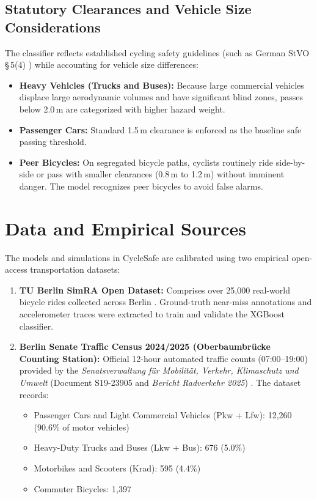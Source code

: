 \subsection{Statutory Clearances and Vehicle Size Considerations}
The classifier reflects established cycling safety guidelines (such as German StVO \S\,5(4) \cite{stvo2020germany}) while accounting for vehicle size differences:
\begin{itemize}
    \item \textbf{Heavy Vehicles (Trucks and Buses):} Because large commercial vehicles displace large aerodynamic volumes and have significant blind zones, passes below 2.0\,m are categorized with higher hazard weight.
    \item \textbf{Passenger Cars:} Standard 1.5\,m clearance is enforced as the baseline safe passing threshold.
    \item \textbf{Peer Bicycles:} On segregated bicycle paths, cyclists routinely ride side-by-side or pass with smaller clearances (0.8\,m to 1.2\,m) without imminent danger. The model recognizes peer bicycles to avoid false alarms.
\end{itemize}

\section{Data and Empirical Sources}
The models and simulations in CycleSafe are calibrated using two empirical open-access transportation datasets:
\begin{enumerate}
    \item \textbf{TU Berlin SimRA Open Dataset:} Comprises over 25,000 real-world bicycle rides collected across Berlin \cite{simra2020crowdsourcing}. Ground-truth near-miss annotations and accelerometer traces were extracted to train and validate the XGBoost classifier.
    \item \textbf{Berlin Senate Traffic Census 2024/2025 (Oberbaumbr{\"u}cke Counting Station):} Official 12-hour automated traffic counts (07:00--19:00) provided by the \textit{Senatsverwaltung f{\"u}r Mobilit{\"a}t, Verkehr, Klimaschutz und Umwelt} (Document S19-23905 and \textit{Bericht Radverkehr 2025}) \cite{berlin2025report}. The dataset records:
    \begin{itemize}
        \item Passenger Cars and Light Commercial Vehicles (Pkw + Lfw): 12,260 (90.6\% of motor vehicles)
        \item Heavy-Duty Trucks and Buses (Lkw + Bus): 676 (5.0\%)
        \item Motorbikes and Scooters (Krad): 595 (4.4\%)
        \item Commuter Bicycles: 1,397
    \end{itemize}
\end{enumerate}


